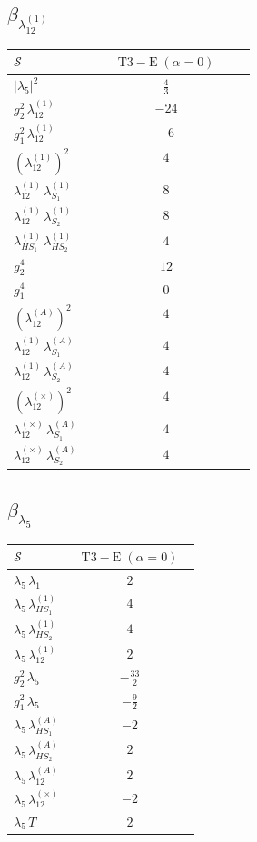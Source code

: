 \documentclass[9pt]{article}
\begin{document}
\subsection*{$ \beta_{\lambda_{12}^{(1)}} $}
\begin{longtable}{@{}p{0.31\linewidth}c@{}}
\toprule
$\mathcal{S}$ & $ \mathrm{T3-E}\;(\alpha=0) $ \\
\midrule
$ |\lambda_5|^2 $ & $ \frac{4}{3} $ \\
$ g_2^2\,\lambda_{12}^{(1)} $ & $ -24 $ \\
$ g_1^2\,\lambda_{12}^{(1)} $ & $ -6 $ \\
$ \left(\lambda_{12}^{(1)}\right)^2 $ & $ 4 $ \\
$ \lambda_{12}^{(1)}\,\lambda_{S_1}^{(1)} $ & $ 8 $ \\
$ \lambda_{12}^{(1)}\,\lambda_{S_2}^{(1)} $ & $ 8 $ \\
$ \lambda_{HS_1}^{(1)}\,\lambda_{HS_2}^{(1)} $ & $ 4 $ \\
$ g_2^4 $ & $ 12 $ \\
$ g_1^4 $ & $ 0 $ \\
$ \left(\lambda_{12}^{(A)}\right)^2 $ & $ 4 $ \\
$ \lambda_{12}^{(1)}\,\lambda_{S_1}^{(A)} $ & $ 4 $ \\
$ \lambda_{12}^{(1)}\,\lambda_{S_2}^{(A)} $ & $ 4 $ \\
$ \left(\lambda_{12}^{(\times)}\right)^2 $ & $ 4 $ \\
$ \lambda_{12}^{(\times)}\,\lambda_{S_1}^{(A)} $ & $ 4 $ \\
$ \lambda_{12}^{(\times)}\,\lambda_{S_2}^{(A)} $ & $ 4 $ \\
\bottomrule
\end{longtable}
\subsection*{$ \beta_{\lambda_5} $}
\begin{longtable}{@{}p{0.31\linewidth}c@{}}
\toprule
$\mathcal{S}$ & $ \mathrm{T3-E}\;(\alpha=0) $ \\
\midrule
$ \lambda_5\,\lambda_1 $ & $ 2 $ \\
$ \lambda_5\,\lambda_{HS_1}^{(1)} $ & $ 4 $ \\
$ \lambda_5\,\lambda_{HS_2}^{(1)} $ & $ 4 $ \\
$ \lambda_5\,\lambda_{12}^{(1)} $ & $ 2 $ \\
$ g_2^2\,\lambda_5 $ & $ - \frac{33}{2} $ \\
$ g_1^2\,\lambda_5 $ & $ - \frac{9}{2} $ \\
$ \lambda_5\,\lambda_{HS_1}^{(A)} $ & $ -2 $ \\
$ \lambda_5\,\lambda_{HS_2}^{(A)} $ & $ 2 $ \\
$ \lambda_5\,\lambda_{12}^{(A)} $ & $ 2 $ \\
$ \lambda_5\,\lambda_{12}^{(\times)} $ & $ -2 $ \\
$ \lambda_5\,T $ & $ 2 $ \\
\bottomrule
\end{longtable}
\end{document}
